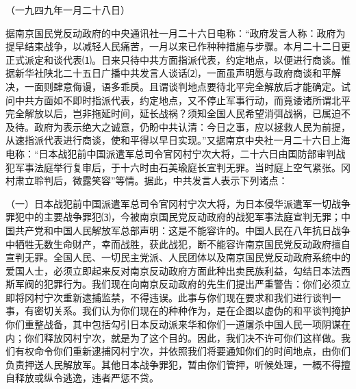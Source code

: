 \documentclass[UTF-8, a5paper, 12pt]{ctexart}
\begin{document}
（一九四九年一月二十八日）

据南京国民党反动政府的中央通讯社一月二十六日电称：“政府发言人称：政府为提早结束战争，以减轻人民痛苦，一月以来已作种种措施与步骤。本月二十二日更正式派定和谈代表⑴。日来只待中共方面指派代表，约定地点，以便进行商谈。惟据新华社陕北二十五日广播中共发言人谈话⑵，一面虽声明愿与政府商谈和平解决，一面则肆意侮谩，语多乖戾。且谓谈判地点要待北平完全解放后才能确定。试问中共方面如不即时指派代表，约定地点，又不停止军事行动，而竟诿诸所谓北平完全解放以后，岂非拖延时间，延长战祸？须知全国人民希望消弭战祸，已属迫不及待。政府为表示绝大之诚意，仍盼中共认清：今日之事，应以拯救人民为前提，从速指派代表进行商谈，使和平得以早日实现。”又据南京中央社一月二十六日上海电称：“日本战犯前中国派遣军总司令官冈村宁次大将，二十六日由国防部审判战犯军事法庭举行复审后，于十六时由石美瑜庭长宣判无罪。当时庭上空气紧张。冈村肃立聆判后，微露笑容”等情。据此，中共发言人表示下列诸点：

（一）日本战犯前中国派遣军总司令官冈村宁次大将，为日本侵华派遣军一切战争罪犯中的主要战争罪犯⑶，今被南京国民党反动政府的战犯军事法庭宣判无罪；中国共产党和中国人民解放军总部声明：这是不能容许的。中国人民在八年抗日战争中牺牲无数生命财产，幸而战胜，获此战犯，断不能容许南京国民党反动政府擅自宣判无罪。全国人民、一切民主党派、人民团体以及南京国民党反动政府系统中的爱国人士，必须立即起来反对南京反动政府方面此种出卖民族利益，勾结日本法西斯军阀的犯罪行为。我们现在向南京反动政府的先生们提出严重警告：你们必须立即将冈村宁次重新逮捕监禁，不得违误。此事与你们现在要求和我们进行谈判一事，有密切关系。我们认为你们现在的种种作为，是在企图以虚伪的和平谈判掩护你们重整战备，其中包括勾引日本反动派来华和你们一道屠杀中国人民一项阴谋在内；你们释放冈村宁次，就是为了这个目的。因此，我们决不许可你们这样做。我们有权命令你们重新逮捕冈村宁次，并依照我们将要通知你们的时间地点，由你们负责押送人民解放军。其他日本战争罪犯，暂由你们管押，听候处理，一概不得擅自释放或纵令逃逸，违者严惩不贷。
\end{document}
